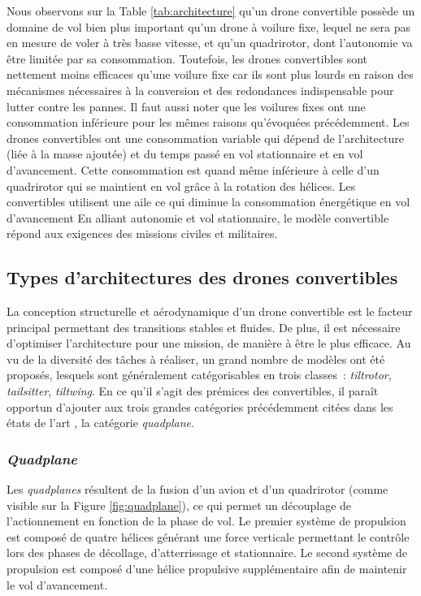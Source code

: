    Nous observons sur la Table \ref{tab:architecture} qu'un drone convertible possède un domaine de vol bien plus important qu'un drone à voilure fixe, lequel ne sera pas en mesure de voler à très basse vitesse, et qu'un quadrirotor, dont l'autonomie va être limitée par sa consommation. Toutefois, les drones convertibles sont nettement moins efficaces qu'une voilure fixe car ils sont plus lourds en raison des mécanismes nécessaires à la conversion et des redondances indispensable pour lutter contre les pannes. Il faut aussi noter que les voilures fixes ont une consommation inférieure pour les mêmes raisons qu'évoquées précédemment. Les drones convertibles ont une consommation variable qui dépend de l'architecture (liée à la masse ajoutée) et du temps passé en vol stationnaire et en vol d'avancement.
   { 
    \color{magenta}Cette consommation est quand même inférieure à celle d'un quadrirotor qui se maintient en vol grâce à la rotation des hélices. Les convertibles utilisent une aile ce qui diminue la consommation énergétique en vol d'avancement
   }
   En alliant autonomie et vol stationnaire, le modèle convertible répond aux exigences des missions civiles et militaires.

    \subsection{Types d'architectures des drones convertibles}
    \label{sec:archConvertible}
    La conception structurelle et aérodynamique d'un drone convertible est le facteur principal permettant des transitions stables et fluides. De plus, il est nécessaire d'optimiser l'architecture pour une mission, de manière à être le plus efficace. Au vu de la diversité des tâches à réaliser, un grand nombre de modèles ont été proposés, lesquels sont généralement catégorisables en trois classes : \textit{tiltrotor}, \textit{tailsitter}, \textit{tiltwing}. 
    En ce qu'il s'agit des prémices des convertibles, il paraît opportun d'ajouter aux trois grandes catégories précédemment citées dans les états de l'art \cite{saeed_survey_2018,ducard_review_2021, review_2022}, la catégorie \textit{quadplane}.

    
        \subsubsection*{\textit{Quadplane}}
        Les \textit{quadplanes} résultent de la fusion d'un avion et d'un quadrirotor (comme visible sur la Figure \ref{fig:quadplane}), ce qui permet un découplage de l'actionnement en fonction de la phase de vol. Le premier système de propulsion est composé de quatre hélices générant une force verticale permettant le contrôle lors des phases de décollage, d'atterrissage et stationnaire. Le second système de propulsion est composé d'une hélice propulsive supplémentaire afin de maintenir le vol d'avancement.

